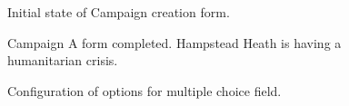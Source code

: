\documentclass{article}
\begin{document}
		\begin{figure}[ht]
			\centering
			\caption{Initial state of Campaign creation form.}
			\label{fig:eval-ca-2}
		\end{figure}

		\begin{figure}[ht]
			\centering
			\caption{Campaign A form completed. Hampstead Heath is having a humanitarian crisis.}
			\label{fig:eval-ca-3}
		\end{figure}

		\begin{figure}[ht]
			\centering
			\caption{Configuration of options for multiple choice field.}
			\label{fig:eval-ca-5}
		\end{figure}
\end{document}
